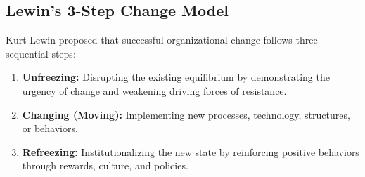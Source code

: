 \documentclass[12pt,a4paper]{article}
\begin{document}
\subsection{Lewin's 3-Step Change Model}
Kurt Lewin proposed that successful organizational change follows three sequential steps:

\begin{tcolorbox}[tikzbox, title={Lewin's 3-Step Change Model}]
\centering
{}
\end{tcolorbox}

\begin{enumerate}[leftmargin=*, itemsep=3pt]
  \item \textbf{Unfreezing:} Disrupting the existing equilibrium by demonstrating the urgency of change and weakening driving forces of resistance.
  \item \textbf{Changing (Moving):} Implementing new processes, technology, structures, or behaviors.
  \item \textbf{Refreezing:} Institutionalizing the new state by reinforcing positive behaviors through rewards, culture, and policies.
\end{enumerate}
\end{document}
